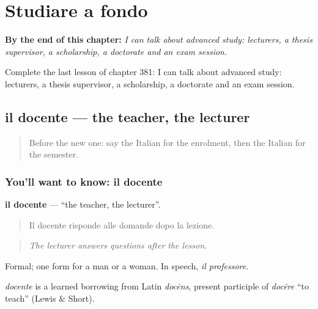 
\chapter{Studiare a fondo}
\label{ch:it-studiare-a-fondo}

\begin{chapteropening}
\textbf{By the end of this chapter:} \emph{I can talk about advanced study: lecturers, a thesis supervisor, a scholarship, a doctorate and an exam session.}

Complete the last lesson of chapter 381: I can talk about advanced study: lecturers, a thesis supervisor, a scholarship, a doctorate and an exam session.
\end{chapteropening}

\section[il docente]{il docente — the teacher, the lecturer}

\label{lesson:IT-C381-docente}



\begin{quote}
Before the new one: say the Italian for the enrolment, then the Italian for the semester.
\end{quote}

\subsection*{You'll want to know: il docente}
\textbf{il docente} — \textquotedblleft{}the teacher, the lecturer\textquotedblright{}.

\begin{quote}
Il docente risponde alle domande dopo la lezione.
\end{quote}

\begin{quote}
\emph{The lecturer answers questions after the lesson.}
\end{quote}

Formal; one form for a man or a woman. In speech, \emph{il professore}.

\begin{cousinweb}
\emph{docente} is a learned borrowing from Latin \emph{docēns}, present participle of \emph{docēre} \textquotedblleft{}to teach\textquotedblright{} (Lewis \& Short).
\end{cousinweb}

